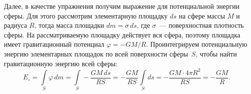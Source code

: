 {\footnotesize

Далее, в качестве упражнения получим выражение для потенциальной энергии сферы. Для этого рассмотрим элементарную площадку $ds$ на сфере массы $M$ и радиуса $R$, тогда масса площадки $dm = \sigma \, ds$, где $\sigma$~--- поверхностная плотность сферы. На рассматриваемую площадку действует вся сфера, поэтому площадка имеет гравитационный потенциал  $\varphi = -GM/R$. Проинтегрируем потенциальную энергию элементарных площадок по всей поверхности сферы~$S$, чтобы найти гравитационную энергию всей сферы:
\begin{equation*}
    E_\circ = \int\limits_S \varphi \, dm = \int\limits_S -\frac{GM \, ds}{R S} = - \frac{GM}{RS} \int\limits_S ds = - \frac{GM \cdot 4 \pi R^2}{RS} = - \frac{GM}{R}.
\end{equation*}

}




